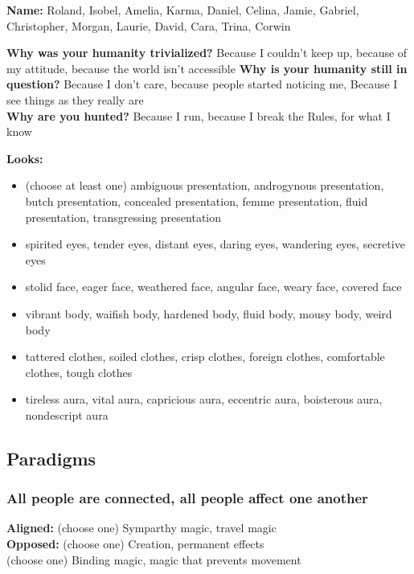 \documentclass[10pt,twoside,openright]{memoir}
\begin{document}
\textbf{Name:} Roland, Isobel, Amelia, Karma, Daniel, Celina, Jamie,
Gabriel, Christopher, Morgan, Laurie, David, Cara, Trina, Corwin

\textbf{Why was your humanity trivialized?} Because I couldn't keep up,
because of my attitude, because the world isn't accessible \textbf{Why
is your humanity still in question?} Because I don't care, because
people started noticing me, Because I see things as they really are\\
\textbf{Why are you hunted?} Because I run, because I break the Rules,
for what I know

\textbf{Looks:}

\begin{itemize}
\tightlist
\item
  (choose at least one) ambiguous presentation, androgynous
  presentation, butch presentation, concealed presentation, femme
  presentation, fluid presentation, transgressing presentation
\item
  spirited eyes, tender eyes, distant eyes, daring eyes, wandering eyes,
  secretive eyes
\item
  stolid face, eager face, weathered face, angular face, weary face,
  covered face
\item
  vibrant body, waifish body, hardened body, fluid body, mousy body,
  weird body
\item
  tattered clothes, soiled clothes, crisp clothes, foreign clothes,
  comfortable clothes, tough clothes
\item
  tireless aura, vital aura, capricious aura, eccentric aura, boisterous
  aura, nondescript aura
\end{itemize}

\hypertarget{paradigms-8}{%
\subsection{Paradigms}\label{paradigms-8}}

\hypertarget{all-people-are-connected-all-people-affect-one-another}{%
\subsubsection{All people are connected, all people affect one
another}\label{all-people-are-connected-all-people-affect-one-another}}

\textbf{Aligned:} (choose one) Symparthy magic, travel magic\\
\textbf{Opposed:} (choose one) Creation, permanent effects\\
(choose one) Binding magic, magic that prevents movement
\end{document}
